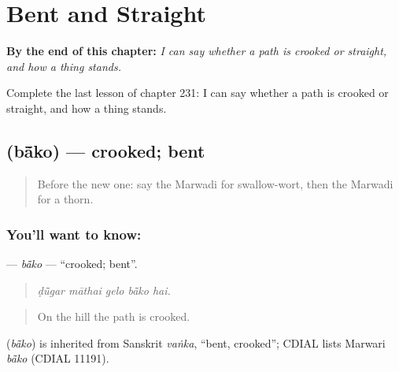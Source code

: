 
\chapter{Bent and Straight}
\label{ch:mw-bent-and-straight}

\begin{chapteropening}
\textbf{By the end of this chapter:} \emph{I can say whether a path is crooked or straight, and how a thing stands.}

Complete the last lesson of chapter 231: I can say whether a path is crooked or straight, and how a thing stands.
\end{chapteropening}

\section[\texorpdfstring{\mw{बांको} (bā̃ko)}{बांको (bā̃ko)}]{ (bā̃ko) — crooked; bent}

\label{lesson:MW-C231-bako}



\begin{quote}
Before the new one: say the Marwadi for swallow-wort, then the Marwadi for a thorn.
\end{quote}

\subsection*{You'll want to know: }
\textbf{} — \emph{bā̃ko} — \textquotedblleft{}crooked; bent\textquotedblright{}.

\begin{quote}
    
\end{quote}

\begin{quote}
\emph{ḍū̃gar māthai gelo bā̃ko hai.}
\end{quote}

\begin{quote}
On the hill the path is crooked.
\end{quote}

\begin{cousinweb}
\textbf{} (\emph{bā̃ko}) is inherited from Sanskrit \emph{vaṅka}, \textquotedblleft{}bent, crooked\textquotedblright{}; CDIAL lists Marwari \emph{bā̃ko} (CDIAL 11191).
\end{cousinweb}

